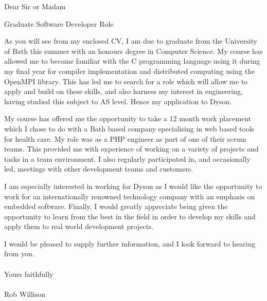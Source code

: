 \documentclass{letter}
\begin{document}
\begin{letter}{}
\vspace*{-10\baselineskip}
\fontsize{12pt}{14pt}\selectfont
\opening{Dear Sir or Madam}

\begin{center}
Graduate Software Developer Role
\end{center}

As you will see from my enclosed CV, I am due to graduate from the University of Bath this
summer with an honours degree in Computer Science.
My course has allowed me to become familiar with the C programming language using it during my final year
for compiler implementation and distributed computing using the OpenMPI library. This has led me
to search for a role which will allow me to apply and build on these skills, and also harness
my interest in engineering, having studied this subject to AS level. Hence my application
to Dyson.

My course has offered me the opportunity to take a 12 month work placement which I chose to do
with a Bath based company specialising in web based tools for health care. My role was
as a PHP engineer as part of one of their scrum teams. This provided me with experience of working on a variety of
projects and tasks in a team environment. I also regularly participated in, and occasionally led,
meetings with other development teams and customers.

I am especially interested in working for Dyson as I would like the opportunity to work for
an internationally renowned technology company with an emphasis on embedded software.
Finally, I would greatly appreciate being given the opportunity to learn from the best in the field in order to
develop my skills and apply them to real world development projects.

I would be pleased to supply further information, and I look forward to hearing from you.
\\~\\
Yours faithfully
\\~\\
Rob Willison

\end{letter}
\end{document}
